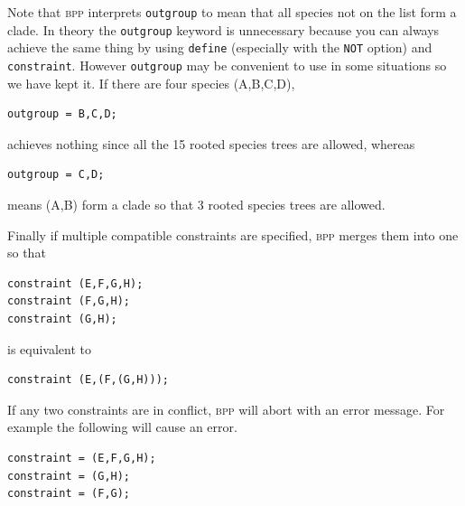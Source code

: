 \documentclass{book}
\numberwithin{equation}{section} \renewcommand{\baselinestretch}{0.55}
\begin{document}
Note that \textsc{bpp} interprets \texttt{outgroup} to mean that all
species not on the list form a clade. In theory the \texttt{outgroup}
keyword is unnecessary because you can always achieve the same thing
by using \texttt{define} (especially with the \texttt{NOT} option) and
\texttt{constraint}. However \texttt{outgroup} may be convenient to
use in some situations so we have kept it. If there are four species
(A,B,C,D),
\begin{verbatim}
outgroup = B,C,D;
\end{verbatim}
achieves nothing since all the 15 rooted species trees are allowed,
whereas
\begin{verbatim}
outgroup = C,D;
\end{verbatim}
means (A,B) form a clade so that 3 rooted species trees are allowed.

Finally if multiple compatible constraints are specified, \textsc{bpp}
merges them into one so that
\begin{verbatim}
constraint (E,F,G,H);
constraint (F,G,H);
constraint (G,H);
\end{verbatim}
is equivalent to
\begin{verbatim}
constraint (E,(F,(G,H)));
\end{verbatim}
If any two constraints are in conflict, \textsc{bpp} will abort with
an error message. For example the following will cause an error.
\begin{verbatim}
constraint = (E,F,G,H);
constraint = (G,H);
constraint = (F,G);
\end{verbatim}
\end{document}
